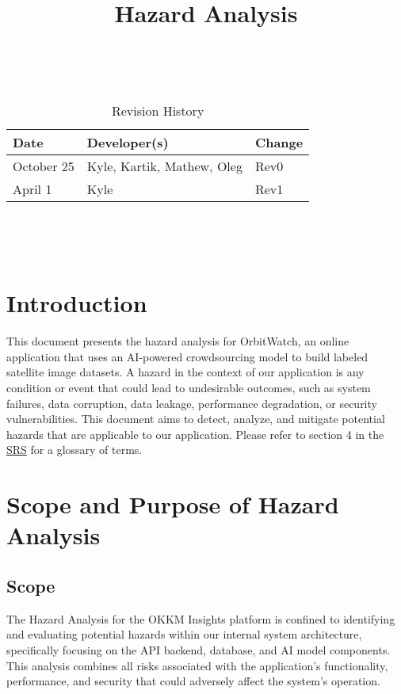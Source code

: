 \documentclass{article}
\title{Hazard Analysis\\\progname}
\author{\authname}
\date{}
\begin{document}
\maketitle
\thispagestyle{empty}

~\newpage


\begin{table}[hp]
\caption{Revision History} \label{TblRevisionHistory}
\begin{tabularx}{\textwidth}{llX}
\toprule
\textbf{Date} & \textbf{Developer(s)} & \textbf{Change}\\
\midrule
October 25 & Kyle, Kartik, Mathew, Oleg & Rev0\\
April 1& Kyle & Rev1\\
\bottomrule
\end{tabularx}
\end{table}

~\newpage

\tableofcontents
\listoftables
~\newpage



\section{Introduction}
This document presents the hazard analysis for OrbitWatch, an online application that uses an AI-powered crowdsourcing model to build labeled satellite image datasets.
A hazard in the context of our application is any condition or event that could lead to undesirable outcomes, such as system failures, data corruption, data leakage, performance degradation, or security vulnerabilities.
This document aims to detect, analyze, and mitigate potential hazards that are applicable to our application.
Please refer to section 4 in the \href{https://github.com/OKKM-insights/OKKM.insights/blob/main/docs/SRS/SRS.pdf}{SRS} for a glossary of terms.
\section{Scope and Purpose of Hazard Analysis}

\subsection{Scope}
The Hazard Analysis for the OKKM Insights platform is confined to identifying and evaluating potential hazards within our internal system architecture, specifically focusing on the API backend, database, and AI model components. This analysis combines all risks associated with the application's functionality, performance, and security that could adversely affect the system's operation.
\end{document}
